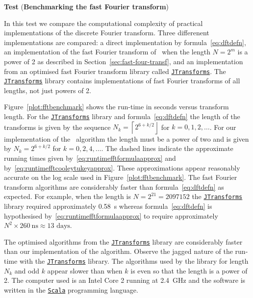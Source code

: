 \documentclass[11pt,a4paper]{book}
\theoremstyle{plain}
\numberwithin{equation}{section}
\newcommand{\round}[1]{{\left\lceil #1 \right\rfloor}}
\newcounter{test}
\newenvironment{test}{
\begin{shaded}\refstepcounter{test}\par\noindent%
\textbf{Test \thetest}
}{
\end{shaded}
}
\begin{document}
\begin{test}\label{test:fastftbenchmarks}
(\textbf{Benchmarking the fast Fourier transform})

In this test we compare the computational complexity of practical implementations of the discrete Fourier transform.  Three differenent implementations are compared: a direct implementation by formula~\eqref{eq:dftdefn}, an implementation of  the fast Fourier transform of~\citet{Cooley_tukey_1965} when the length $N = 2^m$ is a power of 2 as described in Section~\ref{sec:fast-four-transf}, and an implementation from an optimised fast Fourier transform library called \href{https://github.com/wendykierp/JTransforms}{\texttt{JTransforms}}.  The \href{https://github.com/wendykierp/JTransforms}{\texttt{JTransforms}} library contains implementations of fast Fourier transforms of all lengths, not just powers of 2.

Figure~\ref{plot:fftbenchmark} shows the run-time in seconds versus transform length.  For the \href{https://github.com/wendykierp/JTransforms}{\texttt{JTransforms}} library and formula~\eqref{eq:dftdefn} the length of the transforms is given by the sequence $N_k = \round{2^{6 + k/2}}$ for $k = 0,1,2,\dots$.  For our implementation of the~\citet{Cooley_tukey_1965} algorithm the length must be a power of two and is given by $N_k = 2^{6 + k/2}$ for $k = 0,2,4,\dots$.  The dashed lines indicate the approximate running times given by~\eqref{eq:runtimefftformulaapprox} and by~\eqref{eq:runtimefftcooleytukeyapprox}.  These approximations appear reasonably accurate on the log scale used in Figure~\ref{plot:fftbenchmark}.  The fast Fourier transform algorithms are considerably faster than formula~\eqref{eq:dftdefn} as expected.  For example, when the length is $N = 2^{21} = 2097152$ the \href{https://github.com/wendykierp/JTransforms}{\texttt{JTransforms}} library required approximately \SI{0.58}{\second} whereas formula~\eqref{eq:dftdefn} is hypothesised by~\eqref{eq:runtimefftformulaapprox} to require approximately $N^2\times \SI{260}{\nano\second} \approx \text{13 days}$.

The optimised algorithms from the \href{https://github.com/wendykierp/JTransforms}{\texttt{JTransforms}} library are considerably faster than our implementation of the \citet{Cooley_tukey_1965} algorithm.  Observe the jagged nature of the run-time with the \href{https://github.com/wendykierp/JTransforms}{\texttt{JTransforms}} library.  The algorithms used by the library for length $N_k$ and odd $k$ appear slower than when $k$ is even so that the length is a power of 2.  The computer used is an Intel Core 2 running at \SI{2.4}{\giga\hertz} and the software is written in the \href{http://scala-lang.org/}{\texttt{Scala}} programming language.

\end{test}
\end{document}
